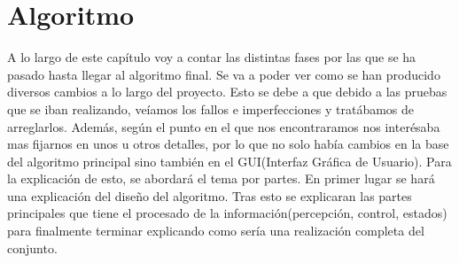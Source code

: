 \chapter{Algoritmo}\label{cap.algoritmo}%

\hspace{1cm} A lo largo de este cap\'itulo voy a contar las distintas fases por las que se ha pasado hasta llegar al algoritmo final. Se va a poder ver como se han producido diversos cambios a lo largo del proyecto. Esto se debe a que debido a las pruebas que se iban realizando, ve\'iamos los fallos e imperfecciones y trat\'abamos de arreglarlos. Adem\'as, seg\'un el punto en el que nos encontraramos nos inter\'esaba mas fijarnos en unos u otros detalles, por lo que no solo hab\'ia cambios en la base del algoritmo principal sino tambi\'en en el GUI(Interfaz Gr\'afica de Usuario). Para la explicaci\'on de esto, se abordar\'a el tema por partes. En primer lugar se har\'a una explicaci\'on del diseño del algoritmo. Tras esto se explicaran las partes principales que tiene el procesado de la informaci\'on(percepci\'on, control, estados) para finalmente terminar explicando como ser\'ia una realizaci\'on completa del conjunto.



